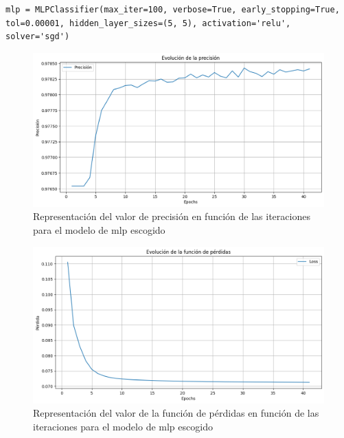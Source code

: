 \vspace{3mm}

\begin{lstlisting}[style=Python, caption={Clasificador MLP óptimo}]
  mlp = MLPClassifier(max_iter=100, verbose=True, early_stopping=True, tol=0.00001, hidden_layer_sizes=(5, 5), activation='relu', solver='sgd')
\end{lstlisting}

\vspace{3mm}

\begin{figure}[H]
  \centering
  \includegraphics[width=1\textwidth]{img/desarrollo/ann/1mlpbestacc.png}
  \caption{Representación del valor de precisión en función de las iteraciones para el modelo de \acrshort{mlp} escogido}
  \label{fig:1mlpbestacc}
\end{figure}

\begin{figure}[H]
  \centering
  \includegraphics[width=1\textwidth]{img/desarrollo/ann/1mlpbestloss.png}
  \caption{Representación del valor de la función de pérdidas en función de las iteraciones para el modelo de \acrshort{mlp} escogido}
  \label{fig:1mlpbestloss}
\end{figure}

